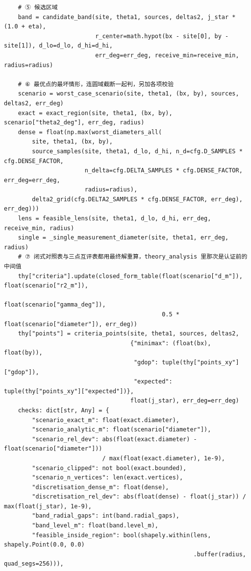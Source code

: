 \documentclass[UTF8, zihao=5,AutoFakeBold=2]{ctexart}
\begin{document}
\begin{lstlisting}
    # ⑤ 候选区域
    band = candidate_band(site, theta1, sources, deltas2, j_star * (1.0 + eta),
                          r_center=math.hypot(bx - site[0], by - site[1]), d_lo=d_lo, d_hi=d_hi,
                          err_deg=err_deg, receive_min=receive_min, radius=radius)

    # ⑥ 最优点的最坏情形，连圆域截断一起判，另加各项校验
    scenario = worst_case_scenario(site, theta1, (bx, by), sources, deltas2, err_deg)
    exact = exact_region(site, theta1, (bx, by), scenario["theta2_deg"], err_deg, radius)
    dense = float(np.max(worst_diameters_all(
        site, theta1, (bx, by),
        source_samples(site, theta1, d_lo, d_hi, n_d=cfg.D_SAMPLES * cfg.DENSE_FACTOR,
                       n_delta=cfg.DELTA_SAMPLES * cfg.DENSE_FACTOR, err_deg=err_deg,
                       radius=radius),
        delta2_grid(cfg.DELTA2_SAMPLES * cfg.DENSE_FACTOR, err_deg), err_deg)))
    lens = feasible_lens(site, theta1, d_lo, d_hi, err_deg, receive_min, radius)
    single = _single_measurement_diameter(site, theta1, err_deg, radius)
    # ⑦ 闭式对照表与三点互评表都用最终解重算，theory_analysis 里那次是认证前的中间值
    thy["criteria"].update(closed_form_table(float(scenario["d_m"]), float(scenario["r2_m"]),
                                             float(scenario["gamma_deg"]),
                                             0.5 * float(scenario["diameter"]), err_deg))
    thy["points"] = criteria_points(site, theta1, sources, deltas2,
                                    {"minimax": (float(bx), float(by)),
                                     "gdop": tuple(thy["points_xy"]["gdop"]),
                                     "expected": tuple(thy["points_xy"]["expected"])},
                                    float(j_star), err_deg=err_deg)
    checks: dict[str, Any] = {
        "scenario_exact_m": float(exact.diameter),
        "scenario_analytic_m": float(scenario["diameter"]),
        "scenario_rel_dev": abs(float(exact.diameter) - float(scenario["diameter"]))
                            / max(float(exact.diameter), 1e-9),
        "scenario_clipped": not bool(exact.bounded),
        "scenario_n_vertices": len(exact.vertices),
        "discretisation_dense_m": float(dense),
        "discretisation_rel_dev": abs(float(dense) - float(j_star)) / max(float(j_star), 1e-9),
        "band_radial_gaps": int(band.radial_gaps),
        "band_level_m": float(band.level_m),
        "feasible_inside_region": bool(shapely.within(lens, shapely.Point(0.0, 0.0)
                                                      .buffer(radius, quad_segs=256))),

\end{lstlisting}
\end{document}
